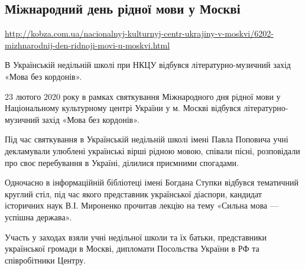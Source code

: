  


\subsection{Міжнародний день рідної мови у Москві}
\label{sec:27_02_2020.kobza_com_ua.1.mova_moskva}

{ \small
\vspace{0.5cm}
\url{http://kobza.com.ua/nacionalnyj-kulturnyj-centr-ukrajiny-v-moskvi/6202-mizhnarodnij-den-ridnoji-movi-u-moskvi.html}
\vspace{0.5cm}
}

В Українській недільній школі при НКЦУ відбувся літературно-музичний захід
«Мова без кордонів».

23 лютого 2020 року в рамках святкування Міжнародного дня рідної мови у
Національному культурному центрі України у м. Москві відбувся
літературно-музичний захід «Мова без кордонів».

Під час святкування в Українській недільній школі імені Павла Поповича учні
декламували улюблені українські вірші рідною мовою, співали пісні, розповідали
про своє перебування в Україні, ділилися приємними спогадами.

Одночасно в інформаційній бібліотеці імені Богдана Ступки відбувся тематичний
круглий стіл, під час якого представник української діаспори, кандидат
історичних наук В.І. Мироненко прочитав лекцію на тему «Сильна мова --- успішна
держава».

Участь у заходах взяли учні недільної школи та їх батьки, представники
української громади в Москві, дипломати Посольства України в РФ  та
співробітники Центру.
